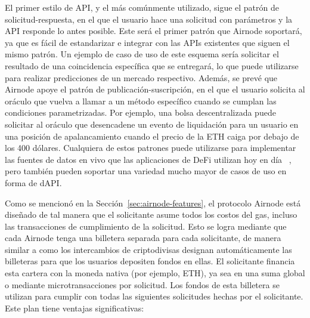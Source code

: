 \documentclass[11pt]{article}
\begin{document}
El primer estilo de API, y el más comúnmente utilizado, sigue el patrón de solicitud-respuesta, en el que el usuario hace una solicitud con parámetros y la API responde lo antes posible. Este será el primer patrón que Airnode soportará, ya que es fácil de estandarizar e integrar con las APIs existentes que siguen el mismo patrón. Un ejemplo de caso de uso de este esquema sería solicitar el resultado de una coincidencia específica que se entregará, lo que puede utilizarse para realizar predicciones de un mercado respectivo. Además, se prevé que Airnode apoye el patrón de publicación-suscripción, en el que el usuario solicita al oráculo que vuelva a llamar a un método específico cuando se cumplan las condiciones parametrizadas. Por ejemplo, una bolsa descentralizada puede solicitar al oráculo que desencadene un evento de liquidación para un usuario en una posición de apalancamiento cuando el precio de la ETH caiga por debajo de los 400 dólares. Cualquiera de estos patrones puede utilizarse para implementar las fuentes de datos en vivo que las aplicaciones de DeFi utilizan hoy en día ~\cite{liu:2020}, pero también pueden soportar una variedad mucho mayor de casos de uso en forma de dAPI.

Como se mencionó en la Sección~\ref{sec:airnode-features}, el protocolo Airnode está diseñado de tal manera que el solicitante asume todos los costos del gas, incluso las transacciones de cumplimiento de la solicitud. Esto se logra mediante que cada Airnode tenga una billetera separada para cada solicitante, de manera similar a como los intercambios de criptodivisas designan automáticamente las billeteras para que los usuarios depositen fondos en ellas. El solicitante financia esta cartera con la moneda nativa (por ejemplo, ETH), ya sea en una suma global o mediante microtransacciones por solicitud. Los fondos de esta billetera se utilizan para cumplir con todas las siguientes solicitudes hechas por el solicitante. Este plan tiene ventajas significativas:
\end{document}
